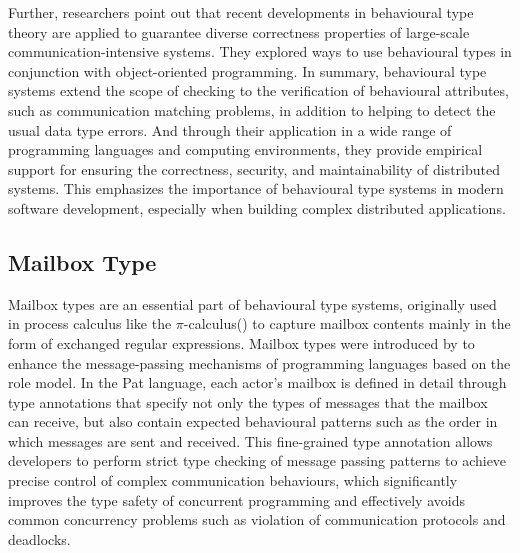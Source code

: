 \documentclass{l4proj}
\begin{document}
Further, \cite{ancona_2016_behavioral} researchers point out that recent developments in behavioural type theory are applied to guarantee diverse correctness properties of large-scale communication-intensive systems. They explored ways to use behavioural types in conjunction with object-oriented programming. In summary, behavioural type systems extend the scope of checking to the verification of behavioural attributes, such as communication matching problems, in addition to helping to detect the usual data type errors. And through their application in a wide range of programming languages and computing environments, they provide empirical support for ensuring the correctness, security, and maintainability of distributed systems. This emphasizes the importance of behavioural type systems in modern software development, especially when building complex distributed applications.

\subsection{Mailbox Type}
Mailbox types are an essential part of behavioural type systems, originally used in process calculus like the $\pi$-calculus(\cite{Pi-calculus}) to capture mailbox contents mainly in the form of exchanged regular expressions. Mailbox types were introduced by \cite{deaposliguoro_2018_mailbox} to enhance the message-passing mechanisms of programming languages based on the role model. In the Pat language, each actor's mailbox is defined in detail through type annotations that specify not only the types of messages that the mailbox can receive, but also contain expected behavioural patterns such as the order in which messages are sent and received. This fine-grained type annotation allows developers to perform strict type checking of message passing patterns to achieve precise control of complex communication behaviours, which significantly improves the type safety of concurrent programming and effectively avoids common concurrency problems such as violation of communication protocols and deadlocks.
\end{document}
